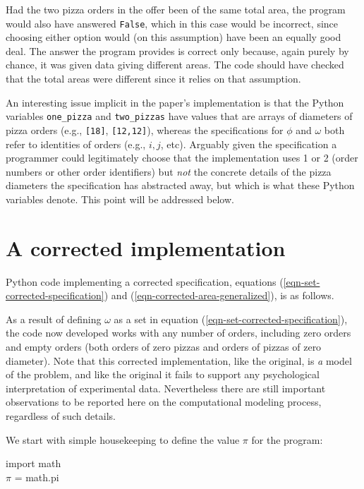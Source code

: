 \documentclass[11pt]{article}
\begin{document}
Had the two pizza orders in the offer been of the same total area, the program would also have answered \texttt{False}, which in this case would be incorrect, since choosing either option would (on this assumption) have been an equally good deal. The answer the program provides is correct only because, again purely by chance, it was given data giving different areas. The code should have checked that the total areas were different since it relies on that assumption.

An interesting issue implicit in the paper's implementation is that the Python variables \verb|one_pizza| and \verb|two_pizzas| have values that are arrays of diameters of pizza orders (e.g., \texttt{[18]}, \texttt{[12,12]}), whereas the specifications for $\phi$ and $\omega$ both refer to identities of orders (e.g., $i, j$, etc). Arguably given the specification a programmer could legitimately choose that the implementation uses 1 or 2 (order numbers or other order identifiers) but \emph{not\/} the concrete details of the pizza diameters the specification has abstracted away, but which is what these Python variables denote. This point will be addressed below.

\section{A corrected implementation}
Python code implementing a corrected specification, equations (\ref{eqn-set-corrected-specification}) and (\ref{eqn-corrected-area-generalized}), is as follows. 

As a result of defining $\omega$ as a set in equation (\ref{eqn-set-corrected-specification}), the code now developed works with any number of orders, including zero orders and empty orders (both orders of zero pizzas and orders of pizzas of zero diameter). Note that this corrected implementation, like the original, is \emph{a\/} model of the problem, and like the original it fails to support any psychological interpretation of experimental data. Nevertheless there are still important observations to be reported here on the computational modeling process, regardless of such details.

We start with simple housekeeping to define the value $\pi$ for the program: 

{\tt\begin{tabbing}
import math\\

$\pi$ = math.pi
\end{tabbing}}
\end{document}
